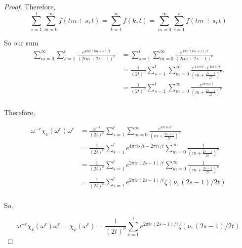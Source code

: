 \documentclass[../article.tex]{subfiles}
\begin{document}
\begin{proof}
Therefore,
\begin{equation}
\sum_{s=1}^{t} \sum_{m=0}^{\infty}  f(tm+s, t) = \sum_{k=1}^{\infty} f(k,t) = \sum_{m=0}^{\infty} \sum_{s=1}^{t} f(tm+s,t)
\end{equation}

So our sum
\begin{equation}
\begin{split}
\sum_{m=0}^{\infty} \sum_{s=1}^{t} \frac{e^{4 \pi ir(tm+s)/t}}{(2tm+2s-1)^{\nu}} &= \sum_{s=1}^{t} \sum_{m=0}^{\infty} \frac{e^{4 \pi ir(tm+s)/t}}{(2tm+2s-1)^{\nu}} \\
&= \frac{1}{(2t)^{\nu}} \sum_{s=1}^{t} \sum_{m=0}^{\infty} \frac{e^{4 \pi imr} \cdot e^{4 \pi r is/t}}{(m+\frac{2s-1}{2t})^{\nu}}. \\
&= \frac{1}{(2t)^{\nu}} \sum_{s=1}^{t} \sum_{m=0}^{\infty} \frac{e^{4 \pi r is/t}}{(m+\frac{2s-1}{2t})^{\nu}} \\
\end{split}
\end{equation}

Therefore,

\begin{equation}
\begin{split}
\omega^{-r}\chi_{\nu}(\omega^r)\omega^r &= \frac{\omega^{-r}}{(2t)^{\nu}} \sum_{s=1}^{t} \sum_{m=0}^{\infty} \frac{e^{4 \pi r is/t}}{(m+\frac{2s-1}{2t})^{\nu}} \\
&=\frac{1}{(2t)^{\nu}} \sum_{s=1}^{t} e^{4 \pi ris/t - 2 \pi ri/t} \sum_{m=0}^{\infty} \frac{1}{(m+\frac{2s-1}{2t})^{\nu}}. \\
&= \frac{1}{(2t)^{\nu}} \sum_{s=1}^{t} e^{2 \pi ir(2s-1)/t} \sum_{m=0}^{\infty} \frac{1}{(m+\frac{2s-1}{2t})^{\nu}} \\
&= \frac{1}{(2t)^{\nu}} \sum_{s=1}^{t} e^{2 \pi ir(2s-1)/t} \zeta(\nu, (2s-1)/2t) \\
\end{split}
\end{equation}

So,

\begin{equation}
\omega^{-r}\chi_{\nu}(\omega^r)\omega^r = \chi_{\nu}(\omega^r) = \frac{1}{(2t)^{\nu}} \sum_{s=1}^{t} e^{2 \pi ir(2s-1)/t} \zeta(\nu, (2s-1)/2t)
\end{equation}


\end{proof}
\end{document}

